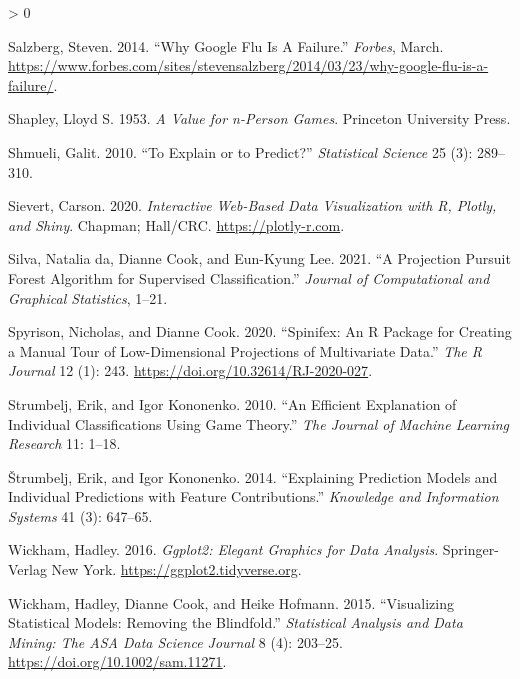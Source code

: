 \documentclass[
]{article}
\newlength{\cslhangindent}
\newenvironment{CSLReferences}[2] %
 {%
  \setlength{\parindent}{0pt}
  \ifodd #1 \everypar{\setlength{\hangindent}{\cslhangindent}}\ignorespaces\fi
  \ifnum #2 > 0
  \setlength{\parskip}{#2\baselineskip}
  \fi
 }%
 {}
\begin{document}
\begin{CSLReferences}{1}{0}
\leavevmode\hypertarget{ref-salzberg_why_2014}{}%
Salzberg, Steven. 2014. {``Why {Google} {Flu} {Is} {A} {Failure}.''} \emph{Forbes}, March. \url{https://www.forbes.com/sites/stevensalzberg/2014/03/23/why-google-flu-is-a-failure/}.

\leavevmode\hypertarget{ref-shapley_value_1953}{}%
Shapley, Lloyd S. 1953. \emph{A Value for n-Person Games}. Princeton University Press.

\leavevmode\hypertarget{ref-shmueli_explain_2010}{}%
Shmueli, Galit. 2010. {``To Explain or to Predict?''} \emph{Statistical Science} 25 (3): 289--310.

\leavevmode\hypertarget{ref-sievert_interactive_2020}{}%
Sievert, Carson. 2020. \emph{Interactive {Web}-{Based} {Data} {Visualization} with {R}, Plotly, and Shiny}. Chapman; Hall/CRC. \url{https://plotly-r.com}.

\leavevmode\hypertarget{ref-da_silva_projection_2021}{}%
Silva, Natalia da, Dianne Cook, and Eun-Kyung Lee. 2021. {``A {Projection} {Pursuit} {Forest} {Algorithm} for {Supervised} {Classification}.''} \emph{Journal of Computational and Graphical Statistics}, 1--21.

\leavevmode\hypertarget{ref-spyrison_spinifex_2020}{}%
Spyrison, Nicholas, and Dianne Cook. 2020. {``Spinifex: An {R} {Package} for {Creating} a {Manual} {Tour} of {Low}-Dimensional {Projections} of {Multivariate} {Data}.''} \emph{The R Journal} 12 (1): 243. \url{https://doi.org/10.32614/RJ-2020-027}.

\leavevmode\hypertarget{ref-strumbelj_efficient_2010}{}%
Strumbelj, Erik, and Igor Kononenko. 2010. {``An Efficient Explanation of Individual Classifications Using Game Theory.''} \emph{The Journal of Machine Learning Research} 11: 1--18.

\leavevmode\hypertarget{ref-strumbelj_explaining_2014}{}%
Štrumbelj, Erik, and Igor Kononenko. 2014. {``Explaining Prediction Models and Individual Predictions with Feature Contributions.''} \emph{Knowledge and Information Systems} 41 (3): 647--65.

\leavevmode\hypertarget{ref-wickham_ggplot2_2016}{}%
Wickham, Hadley. 2016. \emph{Ggplot2: {Elegant} {Graphics} for {Data} {Analysis}}. Springer-Verlag New York. \url{https://ggplot2.tidyverse.org}.

\leavevmode\hypertarget{ref-wickham_visualizing_2015}{}%
Wickham, Hadley, Dianne Cook, and Heike Hofmann. 2015. {``Visualizing Statistical Models: {Removing} the Blindfold.''} \emph{Statistical Analysis and Data Mining: The ASA Data Science Journal} 8 (4): 203--25. \url{https://doi.org/10.1002/sam.11271}.

\end{CSLReferences}
\end{document}
